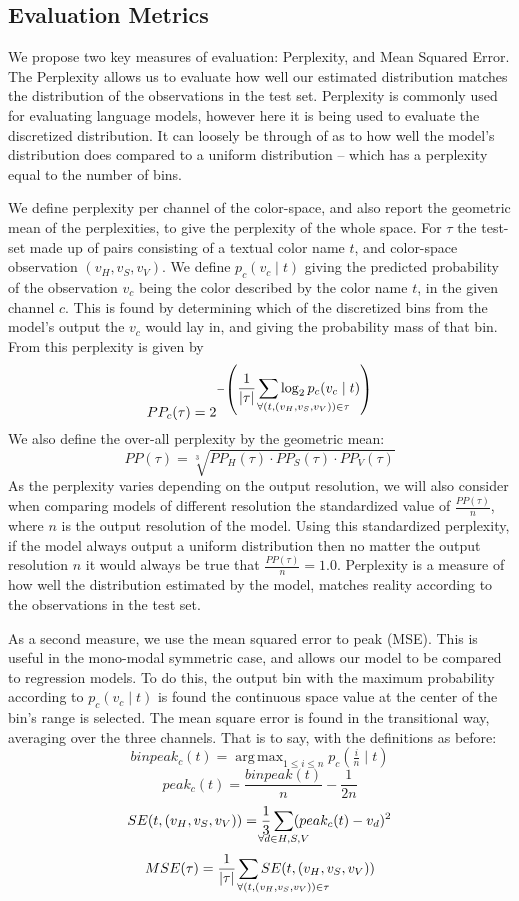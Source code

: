 \documentclass[11pt,letterpaper]{article}
\DeclareMathOperator*{\argmax}{arg\,max}
\begin{document}
\subsection{Evaluation Metrics}
We propose two key measures of evaluation: Perplexity, and Mean Squared Error.
The Perplexity allows us to evaluate how well our estimated distribution matches the distribution of the observations in the test set.
Perplexity is commonly used for evaluating language models, however here it is being used to evaluate the discretized distribution.
It can loosely be through of as to how well the model's distribution does compared to a uniform distribution -- which has a perplexity equal to the number of bins.


We define perplexity per channel of the color-space, and also report the geometric mean of the perplexities, to give the perplexity of the whole space.
For $\tau$ the test-set made up of pairs consisting of a textual color name $t$, and color-space observation $(v_{H}, v_{S}, v_{V})$.
We define $p_{c}(v_{c}\mid t)$ giving the predicted probability of the observation $v_{c}$ being the color described by the color name $t$, in the given channel ${c}$.
This is found by determining which of the discretized bins from the model's output the $v_{c}$ would lay in, and giving the probability mass of that bin.
From this perplexity is given by
\[
 PP_{c}(\tau) = 2^{-\left(
 	\displaystyle\frac{1}{|\tau|} 
 	\displaystyle\sum_{\mathclap{\qquad\qquad\quad
	 		\forall(t,(v_{H}, v_{S}, v_{V})) \in \tau}}
 	 \log_2 p_{c}(v_{c}\mid t)\right)}
\]
We also define the over-all perplexity by the geometric mean: 
\[
PP(\tau) = \sqrt[3]{PP_H(\tau) \cdot PP_S(\tau) \cdot PP_V(\tau)}
\]
As the perplexity varies depending on the output resolution,
we will also consider when comparing models of different resolution the standardized value of $\frac{PP(\tau)}{n}$, where $n$ is the output resolution of the model.
Using this standardized perplexity, if the model always output a uniform distribution then no matter the output resolution $n$ it would always be true that  $\frac{PP(\tau)}{n}=1.0$.
Perplexity is a measure of how well the distribution estimated by the model, matches reality according to the observations in the test set.


As a second measure, we use the mean squared error to peak (MSE).
This is useful in the mono-modal symmetric case, and allows our model to be compared to regression models.
To do this, the output bin with the maximum probability according to $p_c(v_c\mid t)$ is found the continuous space value at the center of the bin's range is selected.
The mean square error is found in the transitional way, averaging over the three channels.
That is to say, with the definitions as before:
\[
binpeak_c(t)=\argmax_{1\le i \le n}{p_c\left(\tfrac{i}{n} \mid t\right)}
\]
\[
peak_c(t)=\frac{binpeak(t)}{n} - \frac{1}{2n}
\]
\[
SE(t, (v_{H}, v_{S}, v_{V})) = \frac{1}{3}
	\sum_{\mathclap{\forall d\in{H,S,V}}} (peak_c(t) - v_d)^2
\]
\[
MSE(\tau) =\frac{1}{|\tau|}
	\sum_{\mathclap{\qquad\qquad\quad
		\forall(t,(v_{H}, v_{S}, v_{V})) \in \tau}}
	 SE(t,(v_{H}, v_{S}, v_{V}))
\]
\end{document}
